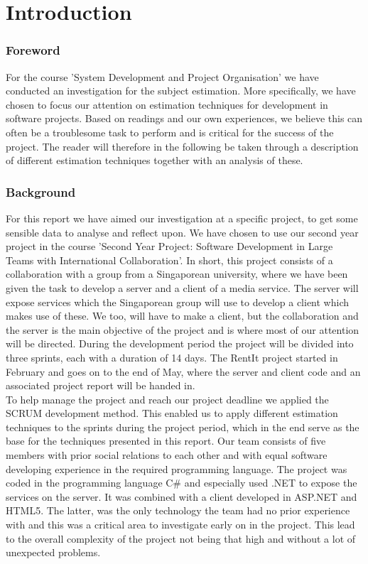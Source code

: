 \part{Introduction}
\section{Foreword}
For the course 'System Development and Project Organisation' we have conducted an investigation for the subject estimation. More specifically, we have chosen to focus our attention on estimation techniques for development in software projects. Based on readings and our own experiences, we believe this can often be a troublesome task to perform and is critical for the success of the project. The reader will therefore in the following be taken through a description of different estimation techniques together with an analysis of these. 

\section{Background}
For this report we have aimed our investigation at a specific project, to get some sensible data to analyse and reflect upon. We have chosen to use our second year project in the course 'Second Year Project: Software Development in Large Teams with International Collaboration'. In short, this project consists of a collaboration with a group from a Singaporean university, where we have been given the task to develop a server and a client of a media service. The server will expose services which the Singaporean group will use to develop a client which makes use of these. We too, will have to make a client, but the collaboration and the server is the main objective of the project and is where most of our attention will be directed. During the development period the project will be divided into three sprints, each with a duration of 14 days. The RentIt project started in February and goes on to the end of May, where the server and client code and an associated project report will be handed in. \\

To help manage the project and reach our project deadline we applied the SCRUM development method. This enabled us to apply different estimation techniques to the sprints during the project period, which in the end serve as the base for the techniques presented in this report. Our team consists of five members with prior social relations to each other and with equal software developing experience in the required programming language. The project was coded in the programming language C\#\cite{cSharp_w} and especially used .NET\cite{.NET_w} to expose the services on the server. It was combined with a client developed in ASP.NET\cite{ASP.NET_w} and HTML5\cite{HTML5_w}. The latter, was the only technology the team had no prior experience with and this was a critical area to investigate early on in the project. This lead to the overall complexity of the project not being that high and without a lot of unexpected problems.\\


